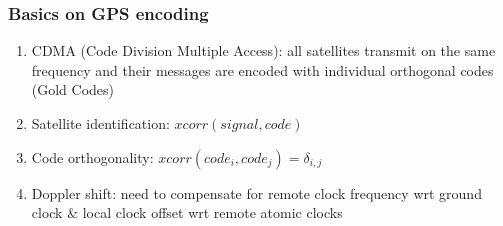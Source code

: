 \documentclass[compress,10pt]{beamer}
\begin{document}
\begin{frame}\frametitle{Basics on GPS encoding}

\begin{enumerate}
\item CDMA (Code Division Multiple Access): all satellites transmit on the same frequency
and their messages are encoded with individual orthogonal codes (Gold Codes)
\item Satellite identification: $xcorr(signal,code)$
\item Code orthogonality: $xcorr(code_i,code_j)=\delta_{i,j}$
\item Doppler shift: need to compensate for remote clock frequency wrt ground clock \& local clock
offset wrt remote atomic clocks
\end{enumerate}

\begin{center}
\end{center}

\end{frame}
\end{document}
